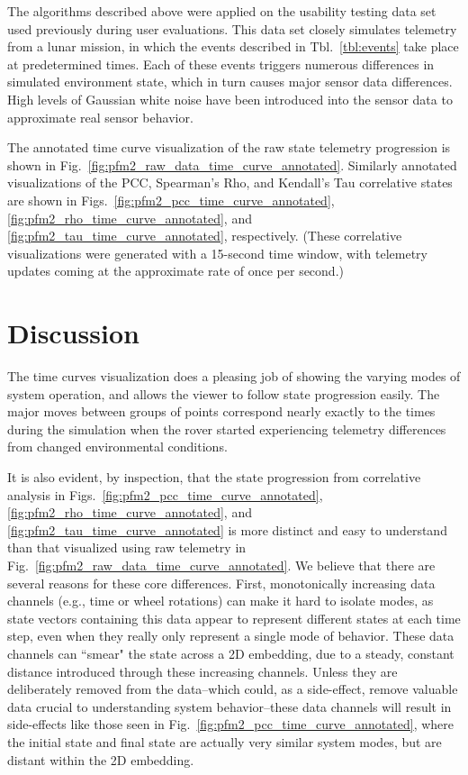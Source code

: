 The algorithms described above were applied on the usability testing data set used previously during user evaluations. This data set closely simulates telemetry from a lunar mission, in which the events described in Tbl.~\ref{tbl:events} take place at predetermined times. Each of these events triggers numerous differences in simulated environment state, which in turn causes major sensor data differences. High levels of Gaussian white noise have been introduced into the sensor data to approximate real sensor behavior.

The annotated time curve visualization of the raw state telemetry progression is shown in Fig.~\ref{fig:pfm2_raw_data_time_curve_annotated}. Similarly annotated visualizations of the PCC, Spearman's Rho, and Kendall's Tau correlative states are shown in Figs.~\ref{fig:pfm2_pcc_time_curve_annotated}, \ref{fig:pfm2_rho_time_curve_annotated}, and \ref{fig:pfm2_tau_time_curve_annotated}, respectively. (These correlative visualizations were generated with a 15-second time window, with telemetry updates coming at the approximate rate of once per second.)

\section{Discussion}

The time curves visualization does a pleasing job of showing the varying modes of system operation, and allows the viewer to follow state progression easily. The major moves between groups of points correspond nearly exactly to the times during the simulation when the rover started experiencing telemetry differences from changed environmental conditions.

It is also evident, by inspection, that the state progression from correlative analysis in Figs.~\ref{fig:pfm2_pcc_time_curve_annotated}, \ref{fig:pfm2_rho_time_curve_annotated}, and \ref{fig:pfm2_tau_time_curve_annotated} is more distinct and easy to understand than that visualized using raw telemetry in Fig.~\ref{fig:pfm2_raw_data_time_curve_annotated}. We believe that there are several reasons for these core differences. First, monotonically increasing data channels (e.g., time or wheel rotations) can make it hard to isolate modes, as state vectors containing this data appear to represent different states at each time step, even when they really only represent a single mode of behavior. These data channels can ``smear" the state across a 2D embedding, due to a steady, constant distance introduced through these increasing channels. Unless they are deliberately removed from the data--which could, as a side-effect, remove valuable data crucial to understanding system behavior--these data channels will result in side-effects like those seen in Fig.~\ref{fig:pfm2_pcc_time_curve_annotated}, where the initial state and final state are actually very similar system modes, but are distant within the 2D embedding.

